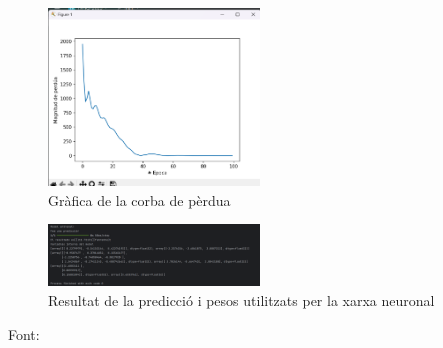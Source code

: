 \begin{figure}[H]
\centering
\includegraphics[width=0.5\textwidth]{./figures/12.png}
\caption{Gràfica de la corba de pèrdua}
\end{figure}

\begin{figure}[H]
\centering
\includegraphics[width=0.5\textwidth]{./figures/13.png}
\caption{Resultat de la predicció i pesos utilitzats per la xarxa neuronal}
\end{figure}

Font: \cite{Xarxa Neuronal}
